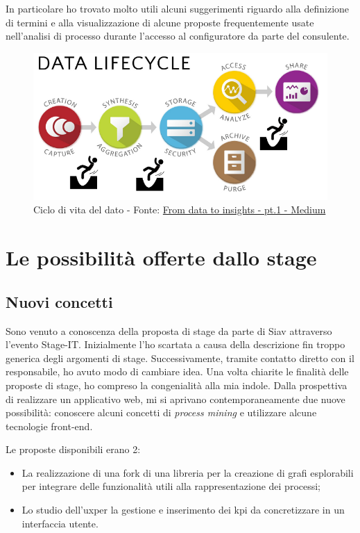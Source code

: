 In particolare ho trovato molto utili alcuni suggerimenti riguardo alla definizione di termini e alla visualizzazione di alcune proposte frequentemente usate nell'analisi di processo durante l'accesso al configuratore da parte del consulente.

\begin{figure}[H]
    \centering
    \includegraphics[width=0.80\columnwidth]{immagini/data_lifecycle.png}
    \caption{Ciclo di vita del dato - Fonte: \href{https://medium.com/digital-transformation-in-the-asset-management/from-data-to-insights-the-immediate-pitfalls-part-i-data-creation-collection-7948568c0059}{From data to insights - pt.1 - Medium}}
    \label{fig:dataLifecycle}
\end{figure}
\section{Le possibilità offerte dallo stage}
\subsection{Nuovi concetti}
Sono venuto a conoscenza della proposta di stage da parte di Siav attraverso l'evento Stage-IT. Inizialmente l'ho scartata a causa della descrizione fin troppo generica degli argomenti di stage. Successivamente, tramite contatto diretto con il responsabile, ho avuto modo di cambiare idea. Una volta chiarite le finalità delle proposte di stage, ho compreso la congenialità alla mia indole. Dalla prospettiva di realizzare un applicativo web, mi si aprivano contemporaneamente due nuove possibilità: conoscere alcuni concetti di \textit{process mining} e utilizzare alcune tecnologie front-end.

Le proposte disponibili erano 2:
\begin{itemize}
    \item La realizzazione di una \gls{fork} di una libreria per la creazione di grafi esplorabili per integrare delle funzionalità utili alla rappresentazione dei processi; 
    \item Lo studio dell'\acrshort{ux}\glsfirstoccur per la gestione e inserimento dei \acrshort{kpi} da concretizzare in un interfaccia utente.
\end{itemize}

